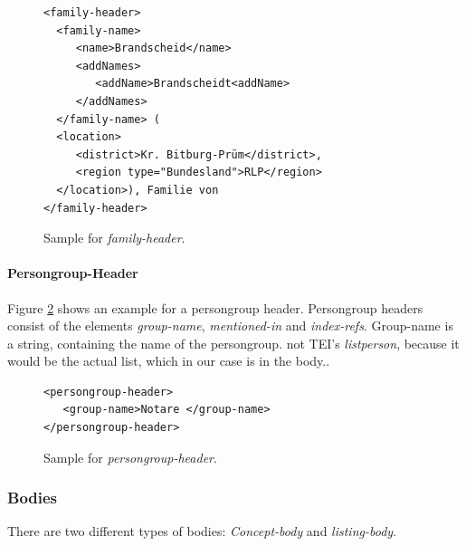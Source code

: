 \begin{figure}[H]
\begin{verbatim}
<family-header>
  <family-name>
     <name>Brandscheid</name>
     <addNames>
        <addName>Brandscheidt<addName>       
     </addNames>
  </family-name> (
  <location>
     <district>Kr. Bitburg-Prüm</district>, 
     <region type="Bundesland">RLP</region>
  </location>), Familie von 
</family-header>
\end{verbatim}
\label{fig:family-header-xml}
\caption{Sample for \textit{family-header}.}
\end{figure}

\paragraph{Persongroup-Header}
Figure \ref{fig:persongroup-header-xml} shows an example for a persongroup header. Persongroup headers consist of the elements \textit{group-name}, \textit{mentioned-in} and \textit{index-refs}. Group-name is a string, containing the name of the persongroup.
not TEI's \textit{listperson}, because it would be the actual list, which in our case is in the body..

\begin{figure}[H]
\begin{verbatim}
<persongroup-header>
   <group-name>Notare </group-name>
</persongroup-header>
\end{verbatim}
\label{fig:persongroup-header-xml}
\caption{Sample for \textit{persongroup-header}.}
\end{figure}

\subsubsection{Bodies}
There are two different types of bodies: \textit{Concept-body} and \textit{listing-body}.

